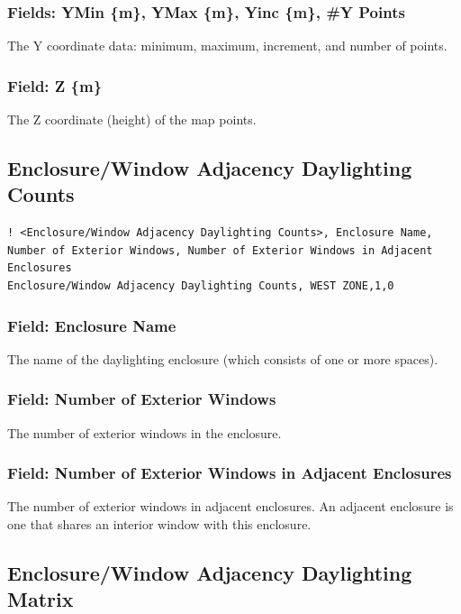 \subsubsection{Fields: YMin \{m\}, YMax \{m\}, Yinc \{m\}, \#Y Points}\label{field-maps-ycoords}
The Y coordinate data: minimum, maximum, increment, and number of points.

\subsubsection{Field: Z \{m\}}\label{field-maps-z}
The Z coordinate (height) of the map points.

\subsection{Enclosure/Window Adjacency Daylighting Counts}\label{daylighting-adjacency-counts}

\begin{lstlisting}
! <Enclosure/Window Adjacency Daylighting Counts>, Enclosure Name, Number of Exterior Windows, Number of Exterior Windows in Adjacent Enclosures
Enclosure/Window Adjacency Daylighting Counts, WEST ZONE,1,0
\end{lstlisting}

\subsubsection{Field: Enclosure Name}\label{field-daylighting-counts-enclosurename}
The name of the daylighting enclosure (which consists of one or more spaces).

\subsubsection{Field: Number of Exterior Windows}\label{field-daylighting-counts-num-ext-windows}
The number of exterior windows in the enclosure.

\subsubsection{Field: Number of Exterior Windows in Adjacent Enclosures}\label{field-daylighting-counts-num-ext-windows-adj-encl}
The number of exterior windows in adjacent enclosures. An adjacent enclosure is one that shares an interior window with this enclosure.


\subsection{Enclosure/Window Adjacency Daylighting Matrix}\label{daylighting-adjacency-matrix}

